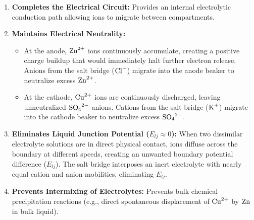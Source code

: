 \begin{conceptbox}
\begin{enumerate}[leftmargin=*]
    \item \textbf{Completes the Electrical Circuit:} Provides an internal electrolytic conduction path allowing ions to migrate between compartments.
    \item \textbf{Maintains Electrical Neutrality:} 
    \begin{itemize}
        \item At the anode, $\ce{Zn^2+}$ ions continuously accumulate, creating a positive charge buildup that would immediately halt further electron release. Anions from the salt bridge ($\ce{Cl-}$) migrate into the anode beaker to neutralize excess $\ce{Zn^2+}$.
        \item At the cathode, $\ce{Cu^2+}$ ions are continuously discharged, leaving unneutralized $\ce{SO4^2-}$ anions. Cations from the salt bridge ($\ce{K+}$) migrate into the cathode beaker to neutralize excess $\ce{SO4^2-}$.
    \end{itemize}
    \item \textbf{Eliminates Liquid Junction Potential ($E_{lj} \approx 0$):} 
    When two dissimilar electrolyte solutions are in direct physical contact, ions diffuse across the boundary at different speeds, creating an unwanted boundary potential difference ($E_{lj}$). The salt bridge interposes an inert electrolyte with nearly equal cation and anion mobilities, eliminating $E_{lj}$.
    \item \textbf{Prevents Intermixing of Electrolytes:} Prevents bulk chemical precipitation reactions (e.g., direct spontaneous displacement of $\ce{Cu^2+}$ by $\ce{Zn}$ in bulk liquid).
\end{enumerate}
\end{conceptbox}

